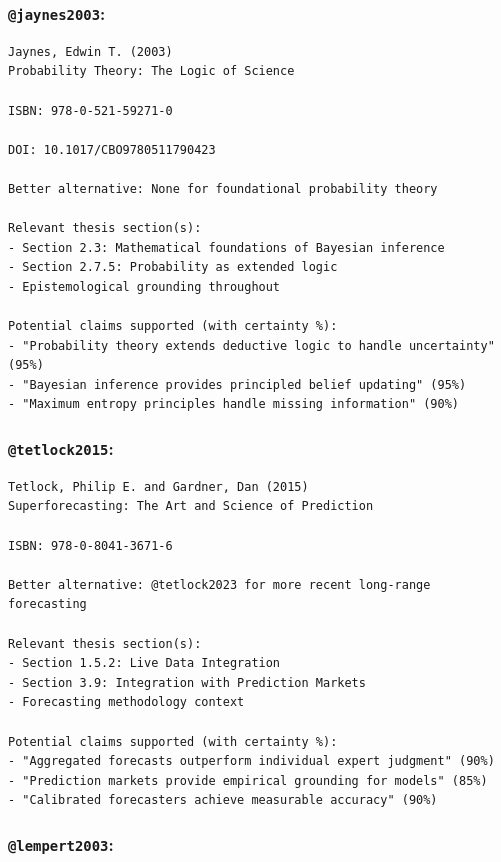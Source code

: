 \documentclass[
  11pt,
  letterpaper,
]{book}
\begin{document}
\subsubsection{\texorpdfstring{\texttt{@jaynes2003}:
\textcite{jaynes2003}}{@jaynes2003: @jaynes2003}}\label{jaynes2003-jaynes2003-1}

\begin{verbatim}
Jaynes, Edwin T. (2003)
Probability Theory: The Logic of Science

ISBN: 978-0-521-59271-0

DOI: 10.1017/CBO9780511790423

Better alternative: None for foundational probability theory

Relevant thesis section(s):
- Section 2.3: Mathematical foundations of Bayesian inference
- Section 2.7.5: Probability as extended logic
- Epistemological grounding throughout

Potential claims supported (with certainty %):
- "Probability theory extends deductive logic to handle uncertainty" (95%)
- "Bayesian inference provides principled belief updating" (95%)
- "Maximum entropy principles handle missing information" (90%)
\end{verbatim}

\subsubsection{\texorpdfstring{\texttt{@tetlock2015}:
\textcite{tetlock2015}}{@tetlock2015: @tetlock2015}}\label{tetlock2015-tetlock2015-1}

\begin{verbatim}
Tetlock, Philip E. and Gardner, Dan (2015)
Superforecasting: The Art and Science of Prediction

ISBN: 978-0-8041-3671-6

Better alternative: @tetlock2023 for more recent long-range forecasting

Relevant thesis section(s):
- Section 1.5.2: Live Data Integration
- Section 3.9: Integration with Prediction Markets
- Forecasting methodology context

Potential claims supported (with certainty %):
- "Aggregated forecasts outperform individual expert judgment" (90%)
- "Prediction markets provide empirical grounding for models" (85%)
- "Calibrated forecasters achieve measurable accuracy" (90%)
\end{verbatim}

\subsubsection{\texorpdfstring{\texttt{@lempert2003}:
\textcite{lempert2003}}{@lempert2003: @lempert2003}}\label{lempert2003-lempert2003-1}
\end{document}
